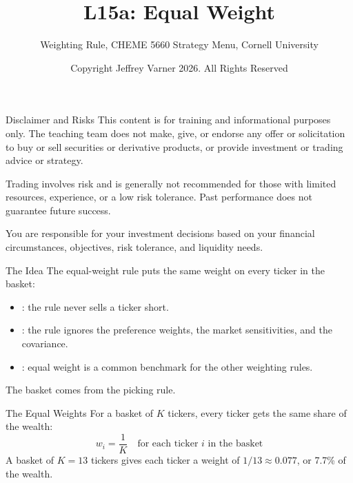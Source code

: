 \documentclass[aspectratio=169,11pt]{beamer}
\title{\texorpdfstring{{\vnheavy L15a}}{L15a}: Equal Weight}
\subtitle{Weighting Rule, CHEME 5660 Strategy Menu, Cornell University}
\author{Copyright Jeffrey Varner 2026. All Rights Reserved}
\begin{document}
\vntitlepage

\begin{frame}{Disclaimer and Risks}
  \vspace{0.6em}
  \textbf{} This content is for training and informational
  purposes only. The teaching team does not make, give, or endorse any offer or
  solicitation to buy or sell securities or derivative products, or provide
  investment or trading advice or strategy.

  \vspace{1.1em}
  \textbf{} Trading involves risk and is generally not recommended for
  those with limited resources, experience, or a low risk tolerance. Past
  performance does not guarantee future success.

  \vspace{1.1em}
  \textbf{} You are responsible for your investment decisions
  based on your financial circumstances, objectives, risk tolerance, and
  liquidity needs.
\end{frame}

\begin{frame}{The Idea}
  \vspace{0.3em}
  The equal-weight rule puts the same weight on every ticker in the basket:
  \begin{itemize}\setlength{\itemsep}{0.5em}
    \item {}: the rule never sells a ticker short.
    \item {}: the rule ignores the preference weights, the market sensitivities, and the covariance.
    \item {}: equal weight is a common benchmark for the other weighting rules.
  \end{itemize}

  \vspace{0.5em}
  The basket comes from the picking rule.
\end{frame}

\begin{frame}{The Equal Weights}
  \vspace{0.3em}
  For a basket of $K$ tickers, every ticker gets the same share of the wealth:
  \[
    \boxed{w_{i}=\frac{1}{K}\quad\text{for each ticker }i\text{ in the basket}}
  \]
  A basket of $K=13$ tickers gives each ticker a weight of $1/13\approx 0.077$, or 7.7\% of the wealth.
\end{frame}
\end{document}
